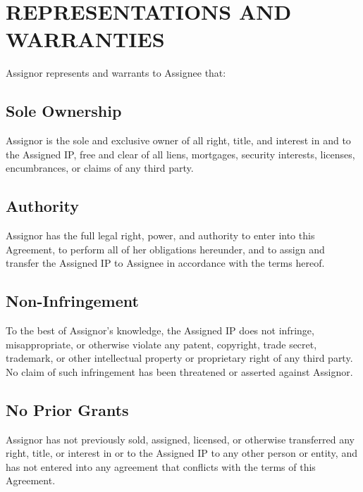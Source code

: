 \section{REPRESENTATIONS AND WARRANTIES}

Assignor represents and warrants to Assignee that:

\subsection{Sole Ownership}
Assignor is the sole and exclusive owner of all right, title, and interest in and to the Assigned IP, free and clear of all liens, mortgages, security interests, licenses, encumbrances, or claims of any third party.

\subsection{Authority}
Assignor has the full legal right, power, and authority to enter into this Agreement, to perform all of her obligations hereunder, and to assign and transfer the Assigned IP to Assignee in accordance with the terms hereof.

\subsection{Non-Infringement}
To the best of Assignor's knowledge, the Assigned IP does not infringe, misappropriate, or otherwise violate any patent, copyright, trade secret, trademark, or other intellectual property or proprietary right of any third party. No claim of such infringement has been threatened or asserted against Assignor.

\subsection{No Prior Grants}
Assignor has not previously sold, assigned, licensed, or otherwise transferred any right, title, or interest in or to the Assigned IP to any other person or entity, and has not entered into any agreement that conflicts with the terms of this Agreement.
